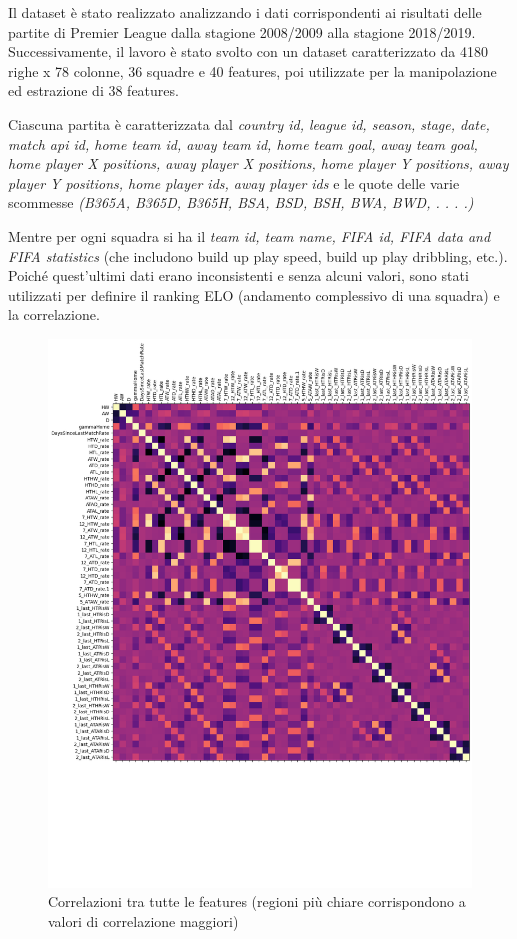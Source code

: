 Il dataset è stato realizzato analizzando i dati corrispondenti ai risultati delle partite di Premier League
dalla stagione 2008/2009 alla stagione 2018/2019.
Successivamente, il lavoro è stato svolto con un dataset caratterizzato da 4180 righe x 78 colonne, 
36 squadre e 40 features, poi utilizzate per la manipolazione ed estrazione di 38 features.

Ciascuna partita è caratterizzata dal \textit{country id, league id, season, stage, date, match api id,
home team id, away team id, home team goal, away team goal, home player X positions,
away player X positions, home player Y positions, away player Y positions, home player ids,
away player ids} e le quote delle varie scommesse \textit{(B365A, B365D, B365H, BSA, BSD, BSH, BWA, BWD, . . . .)}

Mentre per ogni squadra si ha il \textit{team id, team name, FIFA id, FIFA data 
and FIFA statistics} (che includono build up play speed, build up play dribbling, etc.).
Poiché quest'ultimi dati erano inconsistenti e senza alcuni valori, 
sono stati utilizzati per definire il ranking ELO (andamento complessivo di una squadra) e la correlazione. 

\begin{figure}[h]
        \centering
        \includegraphics[scale=0.5]{tesina/img/corr_feat.pdf}
        \caption{Correlazioni tra tutte le features (regioni più chiare corrispondono a valori di correlazione maggiori)}
\end{figure}

